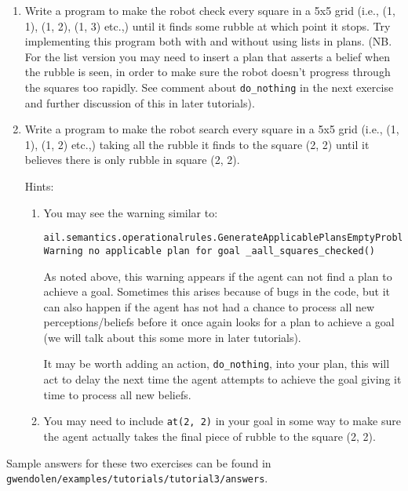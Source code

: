\begin{enumerate}
\item Write a program to make the robot check every square in a 5x5 grid (i.e., (1, 1), (1, 2), (1, 3) etc.,) until it finds some rubble at which point it stops.  Try implementing this program both with and without using lists in plans.  (NB.  For the list version you may need to insert a plan that asserts a belief when the rubble is seen, in order to make sure the robot doesn't progress through the squares too rapidly.  See comment about \lstinline{do_nothing} in the next exercise and further discussion of this in later tutorials).
\item Write a program to make the robot search every square in a 5x5 grid (i.e., (1, 1), (1, 2) etc.,) taking all the rubble it finds to the square (2, 2) until it believes there is only rubble in square (2, 2).

Hints:
\begin{enumerate}
\item You may see the warning similar to:
\begin{small}
\begin{verbatim}
ail.semantics.operationalrules.GenerateApplicablePlansEmptyProblemGoal[WARNING|main|2:09:29]: 
Warning no applicable plan for goal _aall_squares_checked() 
\end{verbatim}
\end{small}
As noted above, this warning appears if the agent can not find a plan to achieve a goal.  Sometimes this arises because of bugs in the code, but it can also happen if the agent has not had a chance to process all new perceptions/beliefs before it once again looks for a plan to achieve a goal (we will talk about this some more in later tutorials).  

It may be worth adding an action, \lstinline{do_nothing}, into your plan, this will act to delay the next time the agent attempts to achieve the goal giving it time to process all new beliefs.
\item You may need to include \lstinline{at(2, 2)} in your goal in some way to make sure the agent actually takes the final piece of rubble to the square (2, 2).
\end{enumerate}
\end{enumerate}
\begin{sloppypar}
Sample answers for these two exercises can be found in \texttt{gwendolen/examples/tutorials/tutorial3/answers}.
\end{sloppypar}
